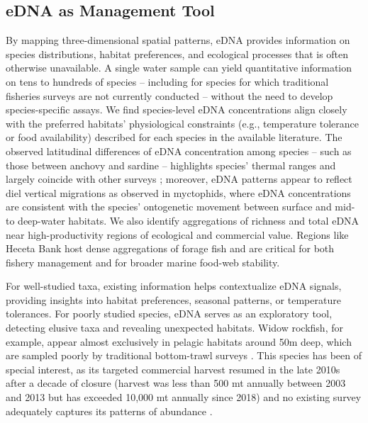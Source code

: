 \documentclass{article}
\begin{document}
\subsection*{eDNA as Management Tool}
By mapping three-dimensional spatial patterns, eDNA provides information on species distributions, habitat preferences, and ecological processes that is often otherwise unavailable. A single water sample can yield quantitative information on tens to hundreds of species -- including for species for which traditional fisheries surveys are not currently conducted -- without the need to develop species-specific assays. We find species-level eDNA concentrations align closely with the preferred habitats' physiological constraints (e.g., temperature tolerance or food availability) described for each species in the available literature. The observed latitudinal differences of eDNA concentration among species – such as those between anchovy and sardine – highlights species’ thermal ranges and largely coincide with other surveys \cite{zwolinski2024}; moreover, eDNA patterns appear to reflect diel vertical migrations as observed in myctophids, where eDNA concentrations are consistent with the species’ ontogenetic movement between surface and mid- to deep-water habitats. We also identify aggregations of richness and total eDNA near high-productivity regions of ecological and commercial value. Regions like Heceta Bank host dense aggregations of forage fish and are critical for both fishery management and for broader marine food-web stability. 

For well-studied taxa, existing information helps contextualize eDNA signals, providing insights into habitat preferences, seasonal patterns, or temperature tolerances. For poorly studied species, eDNA serves as an exploratory tool, detecting elusive taxa and revealing unexpected habitats. Widow rockfish, for example, appear almost exclusively in pelagic habitats around 50m deep, which are sampled poorly by traditional bottom-trawl surveys \cite{keller2017}. This species has been of special interest, as its targeted commercial harvest resumed in the late 2010s after a decade of closure (harvest was less than 500 mt annually between 2003 and 2013 but has exceeded 10,000 mt annually since 2018) and no existing survey adequately captures its patterns of abundance \cite{adams2019a}.
\end{document}
